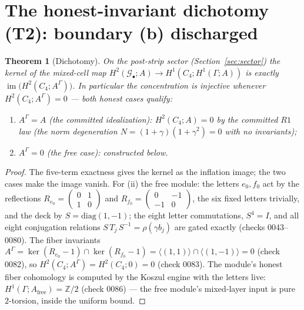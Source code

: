 \documentclass[11pt]{article}
\newtheorem{theorem}{Theorem}
\newcommand{\GammaL}{\Gamma}
\newcommand{\Cfour}{C_4}
\newcommand{\Gbul}{\mathcal{G}_\bullet}
\newcommand{\im}{\operatorname{im}}
\newcommand{\Z}{\mathbb{Z}}
\begin{document}
\section{The honest-invariant dichotomy (T2): boundary (b) discharged}

\begin{theorem}[Dichotomy]\label{th:dich}
On the post-strip sector (Section~\ref{sec:sector}) the kernel of the
mixed-cell map $H^2(\Gbul;A)\to H^1(\Cfour;H^1(\GammaL;A))$ is exactly
$\im\bigl(H^2(\Cfour;A^\GammaL)\bigr)$. In particular the
concentration is injective whenever
$H^2(\Cfour;A^\GammaL)=0$ --- \emph{both} honest cases qualify:
\begin{enumerate}
\item[(i)] $A^\GammaL=A$ (the committed idealization): $H^2(\Cfour;A)=0$
by the committed $R1$ law (the norm degeneration
$N=(1+\gamma)(1+\gamma^2)=0$ with no invariants);
\item[(ii)] $A^\GammaL=0$ (the free case): constructed below.
\end{enumerate}
\end{theorem}

\begin{proof}
The five-term exactness gives the kernel as the inflation image; the
two cases make the image vanish. For (ii) the free module: the letters
$e_0,f_0$ act by the reflections $R_{e_0}=\left(\begin{smallmatrix}0&1\\1&0\end{smallmatrix}\right)$
and $R_{f_0}=\left(\begin{smallmatrix}0&-1\\-1&0\end{smallmatrix}\right)$, the six fixed letters
trivially, and the deck by $S=\mathrm{diag}(1,-1)$; the eight letter
commutations, $S^4=I$, and all eight conjugation relations
$S\,T_j\,S^{-1}=\rho(\gamma b_j)$ are gated exactly (checks
0043--0080). The fiber invariants
$A^\GammaL=\ker(R_{e_0}-1)\cap\ker(R_{f_0}-1)=\langle(1,1)\rangle\cap
\langle(1,-1)\rangle=0$ (check 0082), so $H^2(\Cfour;A^\GammaL)
=H^2(\Cfour;0)=0$ (check 0083). The module's honest fiber cohomology
is computed by the Koszul engine with the letters live:
$H^1(\GammaL;A_{\mathrm{free}})=\Z/2$ (check 0086) --- the free module's
mixed-layer input is pure $2$-torsion, inside the uniform bound.
\end{proof}
\end{document}
